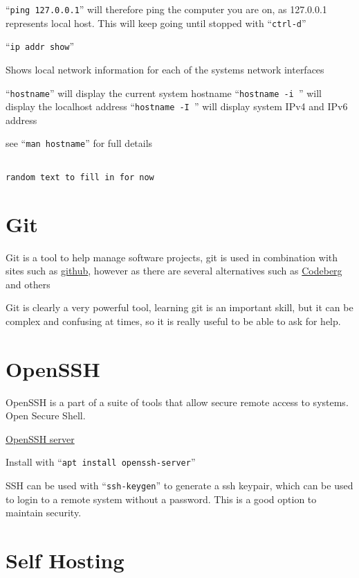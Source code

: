 \documentclass{extbook}
\begin{document}
``\verb|ping 127.0.0.1|'' will therefore ping the computer you are on,  as 127.0.0.1 represents local host.  This will keep going until stopped with ``\verb|ctrl-d|''

``\verb|ip addr show|''

Shows local network information for each of the systems network interfaces

``\verb|hostname|'' will display the current system hostname
``\verb|hostname -i |'' will display the localhost address
``\verb|hostname -I |'' will display system IPv4 and IPv6 address

see ``\verb|man hostname|'' for full details

\begin{verbatim}

random text to fill in for now

\end{verbatim}


\section{Git}

Git is a tool to help manage software projects,  git is used in combination with sites such as \href{https://www.git.com}{github}, however as there are several alternatives such as 
\href{https://codeberg.org/}{Codeberg} and others

Git is clearly a very powerful tool,  learning git is an important skill, but it can be complex and confusing at times, so it is really useful to be able to ask for help. 

\section{OpenSSH}

OpenSSH is a part of a suite of tools that allow secure remote access to systems.  Open Secure Shell.

\href{https://www.openssh.com/}{OpenSSH server}

Install with ``\verb|apt install openssh-server|''

SSH can be used with ``\verb|ssh-keygen|'' to generate a ssh keypair, which can be used to login to a remote system without a password.    This is a good option to maintain security.  


\section{Self Hosting}
\end{document}
